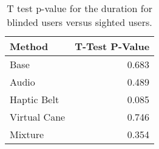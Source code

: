 
\begin{table}[!htb]
\centering
\caption{T test p-value for the duration for blinded users versus sighted users.}
\label{tab:ttest_duration}
\begin{tabular}{lr}
\toprule
      Method &  T-Test P-Value \\
\midrule
        Base &           0.683 \\
       Audio &           0.489 \\
 Haptic Belt &           0.085 \\
Virtual Cane &           0.746 \\
     Mixture &           0.354 \\
\bottomrule
\end{tabular}
\end{table}

